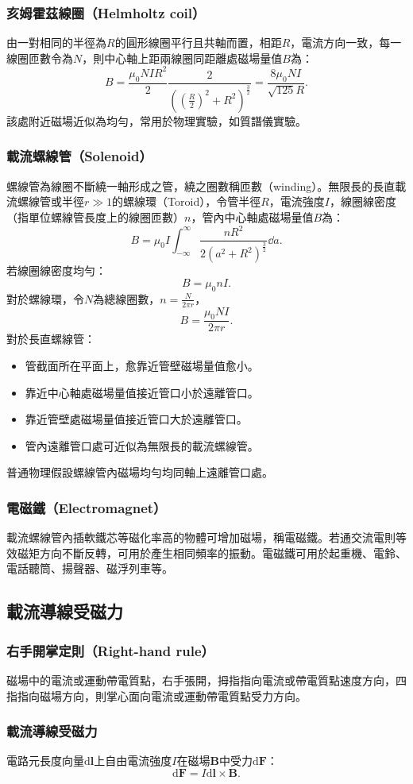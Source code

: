 \documentclass[a4paper,12pt]{report}
\begin{document}
\begin{itemize}
\subsubsection{亥姆霍茲線圈（Helmholtz coil）}
由一對相同的半徑為$R$的圓形線圈平行且共軸而置，相距$R$，電流方向一致，每一線圈匝數令為$N$，則中心軸上距兩線圈同距離處磁場量值$B$為：
\[B=\frac{\mu_0NIR^2}{2}\frac{2}{\left(\left(\frac{R}{2}\right)^2+R^2\right)^{\frac{3}{2}}}=\frac{8\mu_0NI}{\sqrt{125}R}.\]
該處附近磁場近似為均勻，常用於物理實驗，如質譜儀實驗。
\subsubsection{載流螺線管（Solenoid）}
螺線管為線圈不斷繞一軸形成之管，繞之圈數稱匝數（winding）。無限長的長直載流螺線管或半徑$r\gg1$的螺線環（Toroid），令管半徑$R$，電流強度$I$，線圈線密度（指單位螺線管長度上的線圈匝數）$n$，管內中心軸處磁場量值$B$為：
\[B=\mu_0I\int_{-\infty}^{\infty}\frac{nR^2}{2(a^2+R^2)^{\frac{3}{2}}}\dd{a}.\]
若線圈線密度均勻：
\[B=\mu_0nI.\]
對於螺線環，令$N$為總線圈數，$n=\frac{N}{2\pi r}$，
\[B=\frac{\mu_0NI}{2\pi r}.\]
對於長直螺線管：
\begin{itemize}
\item 管截面所在平面上，愈靠近管壁磁場量值愈小。
\item 靠近中心軸處磁場量值接近管口小於遠離管口。
\item 靠近管壁處磁場量值接近管口大於遠離管口。
\item 管內遠離管口處可近似為無限長的載流螺線管。
\end{itemize}
普通物理假設螺線管內磁場均勻均同軸上遠離管口處。
\subsubsection{電磁鐵（Electromagnet）}
載流螺線管內插軟鐵芯等磁化率高的物體可增加磁場，稱電磁鐵。若通交流電則等效磁矩方向不斷反轉，可用於產生相同頻率的振動。電磁鐵可用於起重機、電鈴、電話聽筒、揚聲器、磁浮列車等。
\subsection{載流導線受磁力}
\subsubsection{右手開掌定則（Right-hand rule）}
磁場中的電流或運動帶電質點，右手張開，拇指指向電流或帶電質點速度方向，四指指向磁場方向，則掌心面向電流或運動帶電質點受力方向。
\subsubsection{載流導線受磁力}
電路元長度向量$\mathrm{d}\mathbf{l}$上自由電流強度$I$在磁場$\mathbf{B}$中受力$\mathrm{d}\mathbf{F}$：
\[\mathrm{d}\mathbf{F}=I\mathrm{d}\mathbf{l}\times\mathbf{B}.\]

\end{itemize}
\end{document}
